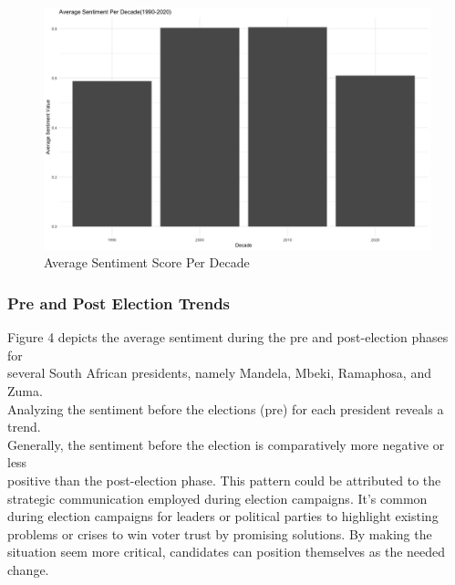 \documentclass[
  letterpaper,
  DIV=11,
  numbers=noendperiod]{scrartcl}
\begin{document}
\begin{figure}

{\centering \includegraphics{docs/Per_Decade.png}

}

\caption{Average Sentiment Score Per Decade}

\end{figure}

\hypertarget{pre-and-post-election-trends}{%
\subsubsection{Pre and Post Election
Trends}\label{pre-and-post-election-trends}}

Figure 4 depicts the average sentiment during the pre and post-election
phases for\\
several South African presidents, namely Mandela, Mbeki, Ramaphosa, and
Zuma.\\
Analyzing the sentiment before the elections (pre) for each president
reveals a trend.\\
Generally, the sentiment before the election is comparatively more
negative or less\\
positive than the post-election phase. This pattern could be attributed
to the strategic communication employed during election campaigns. It's
common during election campaigns for leaders or political parties to
highlight existing problems or crises to win voter trust by promising
solutions. By making the situation seem more critical, candidates can
position themselves as the needed change.
\end{document}

